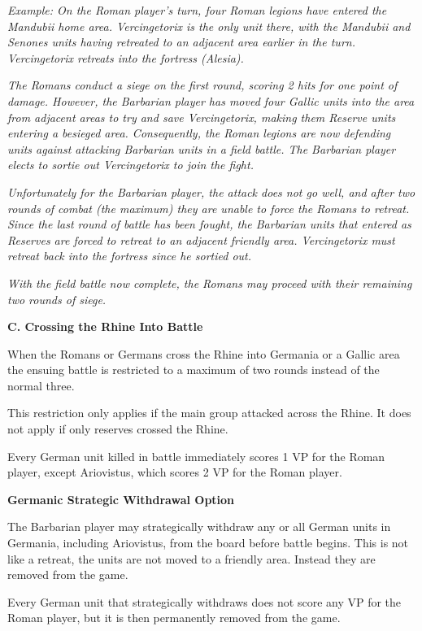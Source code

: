 \textit{Example: On the Roman player's turn, four Roman legions have entered the Mandubii home area. Vercingetorix is the only unit there, with the Mandubii and Senones units having retreated to an adjacent area earlier in the turn. Vercingetorix retreats into the fortress (Alesia).}

\textit{The Romans conduct a siege on the first round, scoring 2 hits for one point of damage. However, the Barbarian player has moved four Gallic units into the area from adjacent areas to try and save Vercingetorix, making them Reserve units entering a besieged area. Consequently, the Roman legions are now defending units against attacking Barbarian units in a field battle. The Barbarian player elects to sortie out Vercingetorix to join the fight.}

\textit{Unfortunately for the Barbarian player, the attack does not go well, and after two rounds of combat (the maximum) they are unable to force the Romans to retreat. Since the last round of battle has been fought, the Barbarian units that entered as Reserves are forced to retreat to an adjacent friendly area. Vercingetorix must retreat back into the fortress since he sortied out.}

\textit{With the field battle now complete, the Romans may proceed with their remaining two rounds of siege.}

\textbf{C. Crossing the Rhine Into Battle}
\par
When the Romans or Germans cross the Rhine into Germania or a Gallic area the ensuing battle is restricted to a maximum of two rounds instead of the normal three.

This restriction only applies if the main group attacked across the Rhine. It does not apply if only reserves crossed the Rhine.

Every German unit killed in battle immediately scores 1 VP for the Roman player, except Ariovistus, which scores 2 VP for the Roman player.

\textbf{Germanic Strategic Withdrawal Option}
\par
The Barbarian player may strategically withdraw any or all German units in Germania, including Ariovistus, from the board before battle begins. This is not like a retreat, the units are not moved to a friendly area. Instead they are removed from the game.

Every German unit that strategically withdraws does not score any VP for the Roman player, but it is then permanently removed from the game.

